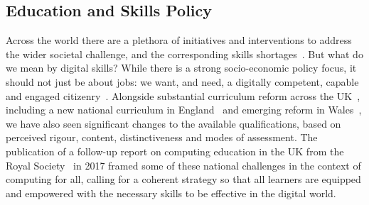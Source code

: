 \documentclass[sigconf]{acmart}
\begin{document}
\subsection{Education and Skills Policy}

Across the world there are a plethora of initiatives and interventions
to address the wider societal challenge, and the corresponding skills
shortages~\cite{cece:2017}. But what do we mean by digital skills?
While there is a strong socio-economic policy focus, it should not
just be about jobs: we want, and need, a digitally competent, capable
and engaged citizenry~\cite{tryfonas+crick:petra2018}. Alongside
substantial curriculum reform across the
UK~\cite{brown-et-al:toce2014}, including a new national curriculum in
England~\cite{DfE2013a} and emerging reform in
Wales~\cite{wgictreview:2013}, we have also seen significant
changes to the available qualifications, based on perceived rigour,
content, distinctiveness and modes of assessment.  The publication of
a follow-up report on computing education in the UK from the Royal
Society~\cite{rs:2017} in 2017 framed some of these national
challenges in the context of computing for all, calling for a coherent
strategy so that all learners are equipped and empowered with the
necessary skills to be effective in the digital world.

\end{document}
